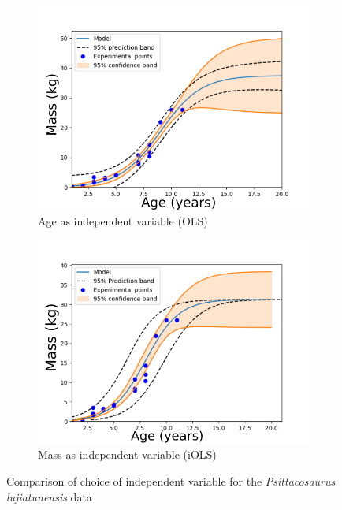 \documentclass[12pt,a4paper]{article}
\begin{document}
\begin{figure}[ht]
	\begin{subfigure}{.5\textwidth}
		\centering
	\includegraphics[width=1.0\linewidth]{gfx/Dino_ex1_ols/OLS}
		\caption{Age as independent variable (OLS)}
		\label{fig:sub-first}
	\end{subfigure}
	\begin{subfigure}{.5\textwidth}
		\centering
	\includegraphics[width=1.0\linewidth]{gfx/Dino_ex1_ols/inverse}
		\caption{Mass as independent variable (iOLS)}
		\label{fig:sub-second}
	\end{subfigure}
	\caption{Comparison of choice of independent variable for the \emph{Psittacosaurus lujiatunensis} data}
	\label{fig:fig}
\end{figure}
\end{document}
